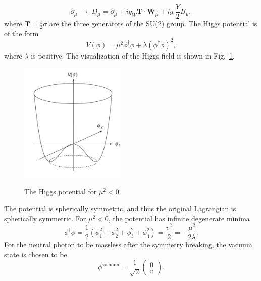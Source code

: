 \begin{equation}
\label{eqn:covderivative_Higgs}
\partial_{\mu}\ \to\ D_{\mu}=\partial_{\mu}+ig_{W}\boldsymbol{T}\cdot\boldsymbol{W}_{\mu}+ig^{\prime}\frac{Y}{2}B_{\mu},
\end{equation}
where $\boldsymbol{T}=\frac{1}{2}\sigma$ are the three generators of the SU(2) group.
The Higgs potential is of the form
\begin{equation}
\label{eqn:Higgspotential}
V(\phi) = \mu^{2}\phi^{\dagger}\phi + \lambda(\phi^{\dagger}\phi)^{2},
\end{equation}
where $\lambda$ is positive.
The visualization of the Higgs field is shown in Fig.~\ref{fig:HiggsPotential}.
\begin{figure}[!ht]
  \begin{center}  
    \includegraphics[width=0.45\textwidth]{Fig/HiggsPotential_MT1}\\
    \caption{The Higgs potential for $\mu^{2}<0$. \label{fig:HiggsPotential}}  
  \end{center}
\end{figure}
The potential is spherically symmetric, and thus the original Lagrangian is spherically symmetric.
For $\mu^{2}<0$, the potential has infinite degenerate minima
\begin{equation}
\label{eqn:Higgspotential}
\phi^{\dagger}\phi = \frac{1}{2}(\phi_{1}^{2}+\phi_{2}^{2}+\phi_{3}^{2}+\phi_{4}^{2})=\frac{v^{2}}{2}=-\frac{\mu^{2}}{2\lambda}.
\end{equation}
For the neutral photon to be massless after the symmetry breaking, the vacuum state is chosen to be
\begin{equation}
\label{eqn:Vacuum_Higgs}
\phi^{\text{vacuum}}=\frac{1}{\sqrt{2}}\begin{pmatrix}
  0 \\
  v  
 \end{pmatrix}
 .
\end{equation}
